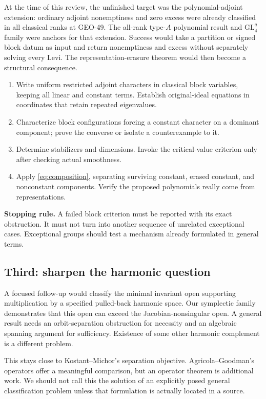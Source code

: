 At the time of this review, the unfinished target was the polynomial-adjoint extension: ordinary adjoint nonemptiness and zero excess were already classified in all classical ranks at GEO-49. The all-rank type-$A$ polynomial result and $\mathrm{GL}_4^q$ family were anchors for that extension. Success would take a partition or signed block datum as input and return nonemptiness and excess without separately solving every Levi. The representation-erasure theorem would then become a structural consequence.
\begin{enumerate}
\item Write uniform restricted adjoint characters in classical block variables, keeping all linear and constant terms. Establish original-ideal equations in coordinates that retain repeated eigenvalues.
\item Characterize block configurations forcing a constant character on a dominant component; prove the converse or isolate a counterexample to it.
\item Determine stabilizers and dimensions. Invoke the critical-value criterion only after checking actual smoothness.
\item Apply \eqref{eq:composition}, separating surviving constant, erased constant, and nonconstant components. Verify the proposed polynomials really come from representations.
\end{enumerate}
\textbf{Stopping rule.} A failed block criterion must be reported with its exact obstruction. It must not turn into another sequence of unrelated exceptional cases. Exceptional groups should test a mechanism already formulated in general terms.

\subsection{Third: sharpen the harmonic question}
A focused follow-up would classify the minimal invariant open supporting multiplication by a specified pulled-back harmonic space. Our symplectic family demonstrates that this open can exceed the Jacobian-nonsingular open. A general result needs an orbit-separation obstruction for necessity and an algebraic spanning argument for sufficiency. Existence of some other harmonic complement is a different problem.

This stays close to Kostant--Michor's separation objective. Agricola--Goodman's operators offer a meaningful comparison, but an operator theorem is additional work. We should not call this the solution of an explicitly posed general classification problem unless that formulation is actually located in a source.

